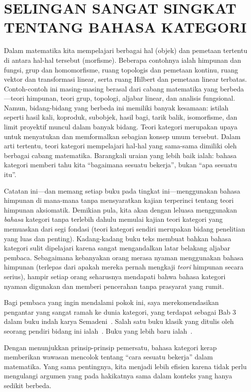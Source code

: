 \chapter{SELINGAN SANGAT SINGKAT TENTANG BAHASA KATEGORI}\label{categories}

Dalam matematika kita mempelajari berbagai hal (objek) dan pemetaan tertentu di antara hal-hal tersebut (morfisme).
Beberapa contohnya ialah himpunan dan fungsi, grup dan homomorfisme, ruang topologis
dan pemetaan kontinu, ruang vektor dan transformasi linear, serta ruang Hilbert dan
pemetaan linear terbatas. Contoh-contoh ini masing-masing berasal dari cabang matematika yang berbeda---teori
himpunan, teori grup, topologi, aljabar linear, dan analisis fungsional.
Namun, bidang-bidang yang berbeda ini memiliki banyak kesamaan: istilah seperti hasil kali,
koproduk, subobjek, hasil bagi, tarik balik, isomorfisme, dan limit proyektif muncul dalam banyak bidang.
Teori kategori merupakan upaya untuk menyatukan dan memformalkan sebagian konsep umum tersebut.
Dalam arti tertentu, teori kategori mempelajari hal-hal yang sama-sama dimiliki oleh berbagai cabang matematika.
Barangkali uraian yang lebih baik ialah: bahasa kategori memberi tahu kita ``bagaimana sesuatu bekerja'',
bukan ``apa sesuatu itu''.

Catatan ini---dan memang setiap buku pada tingkat ini---menggunakan bahasa himpunan di mana-mana tanpa
mensyaratkan kajian terperinci tentang teori himpunan aksiomatik. Demikian pula, kita akan dengan leluasa menggunakan
\emph{bahasa} kategori tanpa terlebih dahulu memulai kajian teori kategori yang memuaskan dari segi
fondasi (teori kategori sendiri merupakan bidang penelitian yang luas dan penting). Kadang-kadang buku teks membuat
bahkan bahasa kategori sulit dipelajari karena sangat mengandalkan latar belakang aljabar pembaca.
Sebagaimana kebanyakan orang merasa nyaman menggunakan bahasa himpunan (terlepas dari apakah mereka pernah mengkaji
\emph{teori} himpunan secara serius), hampir setiap orang seharusnya mendapati bahwa bahasa kategori nyaman digunakan
dan memberi pencerahan tanpa prasyarat yang rumit.

Bagi pembaca yang ingin mendalami pokok ini, saya merekomendasikan pengantar yang sangat ramah ke dunia
kategori, yang terdapat sebagai Bab 3 dalam buku indah karya Semadeni~\cite{Semadeni:1971}. Salah satu buku klasik
yang ditulis oleh seorang pendiri bidang ini ialah~\cite{MacLane:1971}. Buku yang lebih baru ialah~\cite{LawvereS:1997}.

Dengan menunjukkan prinsip-prinsip pemersatu, bahasa kategori kerap memberikan wawasan mencolok tentang
``cara sesuatu bekerja'' dalam matematika. Yang sama pentingnya, kita menjadi lebih efisien karena tidak perlu
mengulangi argumen yang pada hakikatnya sama dalam konteks yang hanya sedikit berbeda.

